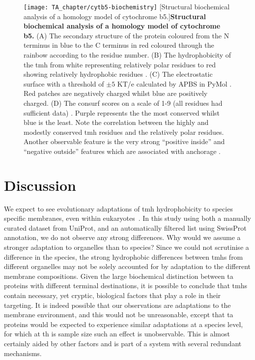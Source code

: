 \begin{figure}[!ht]
\centering
\texttt{[image: TA\_chapter/cytb5-biochemistry]}
		[Structural biochemical analysis of a homology model of cytochrome b5.]{\textbf{Structural biochemical analysis of a homology model of cytochrome b5.}
		(A) The secondary structure of the protein coloured from the N terminus in blue to the C terminus in red coloured through the rainbow according to the residue number.
		(B) The hydrophobicity of the \gls{tmh} from white representing relatively polar residues to red showing relatively hydrophobic residues \cite{Eisenberg1984}.
		(C) The electrostatic surface with a threshold of $\pm5$ KT/e calculated by APBS in PyMol \cite{Baker2001}.
		Red patches are negatively charged whilst blue are positively charged.
		(D) The consurf scores on a scale of 1-9 (all residues had sufficient data) \cite{Ashkenazy2010}. Purple represents the the most conserved whilst blue is the least.
		Note the correlation between the highly and modestly conserved \gls{tmh} residues and the relatively polar residues.
		Another observable feature is the very strong ``positive inside'' \cite{VonHeijne1989, Andersson1992, Sharpe2010, Baeza-Delgado2013, Pogozheva2013} and ``negative outside'' features which are associated with anchorage \cite{Baker2017}.
}

\label{fig:cytb5-biochemistry}
\end{figure}

\section{Discussion}

We expect to see evolutionary adaptations of \gls{tmh} hydrophobicity to species specific membranes, even within eukaryotes~\cite{Baker2017, Sharpe2010}.
In this study using both a manually curated dataset from UniProt, and an automatically filtered list using SwissProt annotation, we do not observe any strong differences.
Why would we assume a stronger adaptation to organelles than to species?
Since we could not scrutinise a difference in the species, the strong hydrophobic differences between \gls{tmh}s from different organelles may not be solely accounted for by adaptation to the different membrane compositions.
Given the large biochemical distinction between \gls{ta} proteins with different terminal destinations, it is possible to conclude that \gls{tmh}s contain necessary, yet cryptic, biological factors that play a role in their targeting.
It is indeed possible that our observations are adaptations to the membrane environment, and this would not be unreasonable, except that \gls{ta} proteins would be expected to experience similar adaptations at a species level, for which at th  is sample size such an effect is unobservable.
This is almost certainly aided by other factors and is part of a system with several redundant mechanisms.

